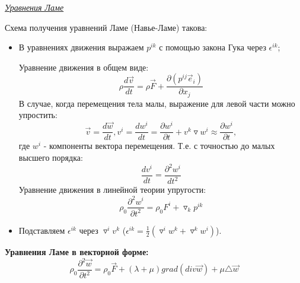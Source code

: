 \begin{center}
	\textit{\underline{Уравнения Ламе}}
\end{center}
\quad Схема получения уравнений Ламе (Навье-Ламе) такова:
\begin{itemize}
\item В уравнениях движения выражаем $p^{ik}$ с помощью закона Гука через $\epsilon^{ik}$;

Уравнение движения в общем виде: $$\rho\frac{d\vec{v}}{dt} = \rho \vec{F} + \frac{\partial (p^{ij}\vec{e}_i)}{\partial x_j}$$
В случае, когда перемещения тела малы, выражение для левой части можно упростить: $$\vec{v} = \frac{d \vec{w}}{dt}, v^i = \frac{d w^i}{dt} = \frac{\partial w^i}{\partial t} + v^k \triangledown w^i \approx \frac{\partial w^i}{\partial t},$$
где $w^i$ - компоненты вектора перемещения. Т.е. с точностью до малых высшего порядка: $$\frac{d v^i}{dt} = \frac{\partial^2 w^i}{dt^2}$$
Уравнение движения в линейной теории упругости: $$\rho_0\frac{\partial^2 w^i}{\partial t^2} = \rho_0 F^i + \triangledown_k p^{ik}$$
\item Подставляем $\epsilon^{ik}$ через $\triangledown^i v^k$ ($\epsilon^{ik} = \frac{1}{2}(\triangledown^i w^k + \triangledown^k w^i)$).
\end{itemize}

\textbf{Уравнения Ламе в векторной форме:} $$\rho_0\frac{\partial^2 \vec{w}}{\partial t^2} = \rho_0\vec{F} + (\lambda + \mu)grad(div\vec{w}) + \mu \triangle \vec{w}$$

